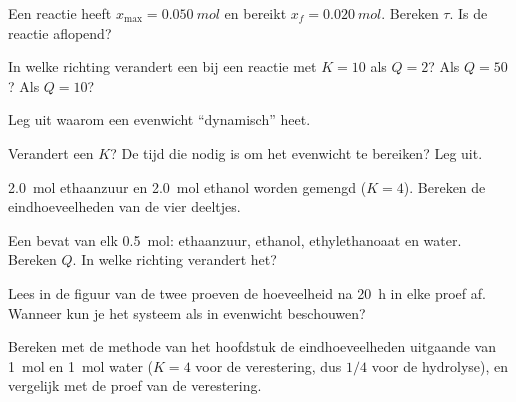\begin{exercise}[$\star$]\label{exo:g12:equilibrium:2}
Een reactie heeft $x_{\max} = \qty{0.050}{mol}$ en bereikt
$x_f = \qty{0.020}{mol}$. Bereken $\tau$. Is de reactie aflopend?
\end{exercise}

\begin{exercise}[$\star$]\label{exo:g12:equilibrium:3}
In welke richting verandert een  bij een reactie met $K = 10$ als
$Q = 2$? Als $Q = 50$? Als $Q = 10$?
\end{exercise}

\begin{exercise}[$\star$]\label{exo:g12:equilibrium:4}
Leg uit waarom een evenwicht ``dynamisch'' heet.
\end{exercise}

\begin{exercise}[$\star$]\label{exo:g12:equilibrium:5}
Verandert een  $K$? De tijd die nodig is om het evenwicht te
bereiken? Leg uit.
\end{exercise}

\begin{exercise}[$\star\star$]\label{exo:g12:equilibrium:6}
\qty{2.0}{mol} ethaanzuur en \qty{2.0}{mol} ethanol worden gemengd
($K = 4$). Bereken de eindhoeveelheden van de vier deeltjes.
\end{exercise}

\begin{exercise}[$\star\star$]\label{exo:g12:equilibrium:7}
Een  bevat van elk \qty{0.5}{mol}: ethaanzuur, ethanol,
ethylethanoaat en water. Bereken $Q$. In welke richting verandert het?
\end{exercise}

\begin{exercise}[$\star\star$]\label{exo:g12:equilibrium:8}
Lees in de figuur van de twee proeven de hoeveelheid  na
\qty{20}{h} in elke proef af. Wanneer kun je het systeem als in evenwicht
beschouwen?
\end{exercise}

\begin{exercise}[$\star\star$]\label{exo:g12:equilibrium:9}
Bereken met de methode van het hoofdstuk de eindhoeveelheden uitgaande van
\qty{1}{mol}  en \qty{1}{mol} water ($K = 4$ voor de verestering,
dus $1/4$ voor de hydrolyse), en vergelijk met de proef van de
verestering.
\end{exercise}

